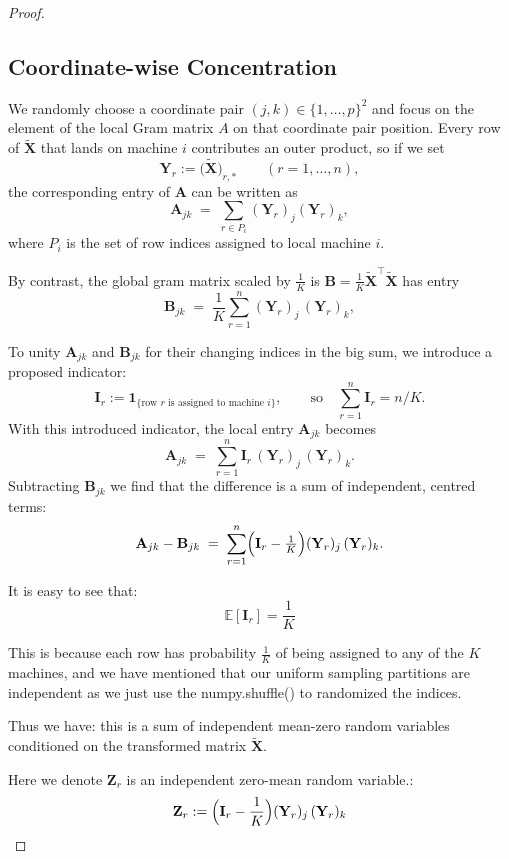 \documentclass[11pt]{article}
\numberwithin{equation}{section}
\theoremstyle{plain}
\theoremstyle{definition}
\theoremstyle{remark}
\begin{document}
\begin{proof}
\subsection{Coordinate-wise Concentration}
We randomly choose a coordinate pair \((j,k)\in\{1,\dots,p\}^{2}\) and focus on
the element of the local Gram matrix \(A\) on that coordinate pair position.
Every row of $\tilde{\mathbf{X}}$ that lands on machine $i$ contributes an
outer product, so if we set
\[
  \mathbf{Y}_{r}:=\bigl(\tilde{\mathbf{X}}\bigr)_{r,*}\qquad(r=1,\dots,n),
\]
the corresponding entry of $\mathbf{A}$ can be written as
\[
  \mathbf{A}_{jk} \;=\; \sum_{r\in P_i} (\mathbf{Y}_r)_j (\mathbf{Y}_r)_k,
\]
where \(P_i\) is the set of row indices assigned to local machine \(i\).

By contrast, the global gram matrix scaled by $\tfrac1K$ is
\(\mathbf{B}=\tfrac1K \tilde{\mathbf{X}}^{\top}\tilde{\mathbf{X}}\) has entry
\[
  \mathbf{B}_{jk}\;=\;\frac1K\sum_{r=1}^{n}(\mathbf{Y}_{r})_{j}\,(\mathbf{Y}_{r})_{k},
\]

To unity $\mathbf{A}_{jk}$ and $\mathbf{B}_{jk}$ for their changing indices in the big sum, we introduce a proposed indicator:
\[
  \mathbf{I}_{r}:=\mathbf 1_{\bigl\{\text{row }r\text{ is assigned to machine }i\bigr\}},
  \qquad\text{so}\quad\sum_{r=1}^{n}\mathbf{I}_{r}=n/K.
\]
With this introduced indicator, the local entry $\mathbf{A}_{jk}$ becomes
\[
  \mathbf{A}_{jk}\;=\;\sum_{r=1}^{n}\mathbf{I}_{r}\,(\mathbf{Y}_{r})_{j}\,(\mathbf{Y}_{r})_{k}.
\]
Subtracting \(\mathbf{B}_{jk}\) we find that the difference is a sum of
independent, centred terms:
\[
  \mathbf{A}_{jk}-\mathbf{B}_{jk}
    \;=\;
    \sum_{r=1}^{n}\Bigl(\mathbf{I}_{r}-\tfrac1K\Bigr)
      (\mathbf{Y}_{r})_{j}\,(\mathbf{Y}_{r})_{k}.
\]

It is easy to see that:
\[
\mathbb{E}[\mathbf{I}_r] = \frac{1}{K}
\]

This is because each row has probability \(\frac{1}{K}\) of being
assigned to any of the \(K\) machines, and we have mentioned that our uniform sampling partitions are independent as we just use the numpy.shuffle() to randomized the indices.

Thus we have: this is a sum of independent mean-zero random variables conditioned on the transformed matrix \(\tilde{\mathbf{X}}\).

Here we denote $\mathbf{Z}_r$ is an independent zero-mean random variable.:
  \[
  \mathbf{Z}_{r} := \Bigl(\mathbf{I}_{r}-\frac{1}{K}\Bigr)(\mathbf{Y}_{r})_{j}\,(\mathbf{Y}_{r})_{k}
  \]


\end{proof}
\end{document}
